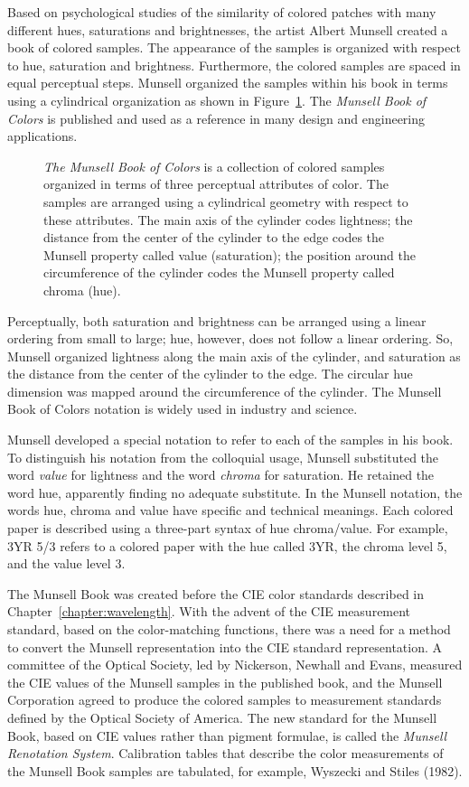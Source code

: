 Based on psychological studies of the similarity of colored patches
with many different hues, saturations and brightnesses, the artist
Albert Munsell created a book of colored samples.  The appearance of
the samples is organized with respect to hue, saturation and
brightness.  Furthermore, the colored samples are spaced in equal
perceptual steps.  Munsell organized the samples within his book in
terms using a cylindrical organization as shown in
Figure~\ref{f8:munsell}.  The {\em Munsell Book of Colors} is
published and used as a reference in many design and engineering
applications.
\begin{figure}
\centerline{
   }
\caption[Munsell Organization]{ {\em The Munsell Book of Colors} is a
collection of colored samples organized in terms of three perceptual
attributes of color.  The samples are arranged using a cylindrical
geometry with respect to these attributes.  The main axis of the
cylinder codes lightness; the distance from the center of the
cylinder to the edge codes the Munsell property called value
(saturation); the position around the circumference of the cylinder
codes the Munsell property called chroma (hue).  } 
\label{f8:munsell}
\end{figure}

Perceptually, both saturation and brightness can be arranged using a
linear ordering from small to large; hue, however, does not follow a
linear ordering.  So, Munsell organized lightness along the main axis
of the cylinder, and saturation as the distance from the center of the
cylinder to the edge.  The circular hue dimension was mapped around
the circumference of the cylinder. The Munsell Book of Colors notation
is widely used in industry and science.

Munsell developed a special notation to refer to each of the samples
in his book.  To distinguish his notation from the colloquial usage,
Munsell substituted the word {\em value} for lightness and the word
{\em chroma} for saturation.  He retained the word hue, apparently
finding no adequate substitute.  In the Munsell notation, the words
hue, chroma and value have specific and technical meanings.
Each colored paper is described using a three-part syntax of hue
chroma/value.  For example, 3YR 5/3 refers to a colored paper with the
hue called 3YR, the chroma level 5, and the value level 3.

The Munsell Book was created before the CIE color standards described in
Chapter~\ref{chapter:wavelength}.  With the advent of the CIE measurement
standard, based on the color-matching functions, there was
a need for a method to convert the Munsell representation into the CIE
standard representation.  A committee of the Optical Society, led by
Nickerson, Newhall and Evans, measured the CIE values of the Munsell
samples in the published book, and the Munsell Corporation agreed to
produce the colored samples to measurement standards defined by the
Optical Society of America.  The new standard for the Munsell Book,
based on CIE values rather than pigment formulae, is called the {\em
Munsell Renotation System}.  Calibration tables that describe the
color measurements of the Munsell Book samples are tabulated, for
example, Wyszecki and Stiles (1982).

